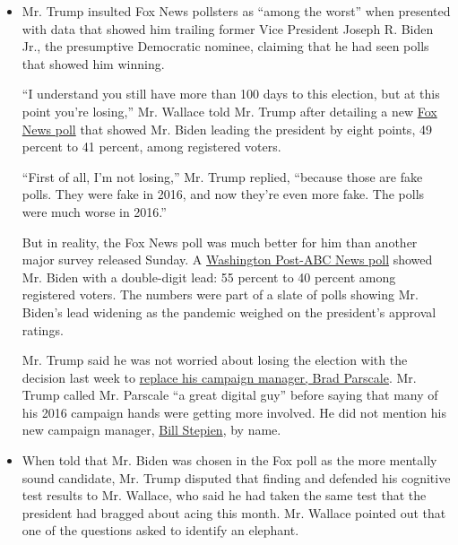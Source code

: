 \begin{itemize}
\item
  Mr. Trump insulted Fox News pollsters as ``among the worst'' when
  presented with data that showed him trailing former Vice President
  Joseph R. Biden Jr., the presumptive Democratic nominee, claiming that
  he had seen polls that showed him winning.

  ``I understand you still have more than 100 days to this election, but
  at this point you're losing,'' Mr. Wallace told Mr. Trump after
  detailing a new
  \href{https://static.foxnews.com/foxnews.com/content/uploads/2020/07/Fox_July-12-15-2020_Complete_National_Topline_July-19-Release.pdf}{Fox
  News poll} that showed Mr. Biden leading the president by eight
  points, 49 percent to 41 percent, among registered voters.

  ``First of all, I'm not losing,'' Mr. Trump replied, ``because those
  are fake polls. They were fake in 2016, and now they're even more
  fake. The polls were much worse in 2016.''

  But in reality, the Fox News poll was much better for him than another
  major survey released Sunday. A
  \href{https://www.washingtonpost.com/politics/biden-leads-by-double-digits-as-coronavirus-takes-a-toll-on-the-president-post-abc-poll-finds/2020/07/18/8d041884-c840-11ea-b037-f9711f89ee46_story.html}{Washington
  Post-ABC News poll} showed Mr. Biden with a double-digit lead: 55
  percent to 40 percent among registered voters. The numbers were part
  of a slate of polls showing Mr. Biden's lead widening as the pandemic
  weighed on the president's approval ratings.

  Mr. Trump said he was not worried about losing the election with the
  decision last week to
  \href{https://www.nytimes3xbfgragh.onion/2020/07/15/us/politics/trump-campaign-brad-parscale.html}{replace
  his campaign manager, Brad Parscale}. Mr. Trump called Mr. Parscale
  ``a great digital guy'' before saying that many of his 2016 campaign
  hands were getting more involved. He did not mention his new campaign
  manager,
  \href{https://www.nytimes3xbfgragh.onion/article/bill-stepien.html}{Bill
  Stepien}, by name.
\item
  When told that Mr. Biden was chosen in the Fox poll as the more
  mentally sound candidate, Mr. Trump disputed that finding and defended
  his cognitive test results to Mr. Wallace, who said he had taken the
  same test that the president had bragged about acing this month. Mr.
  Wallace pointed out that one of the questions asked to identify an
  elephant.


\end{itemize}
